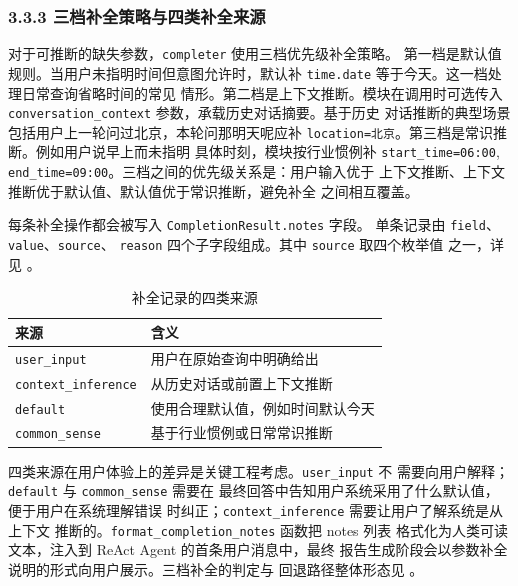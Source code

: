 \subsubsection*{3.3.3 \quad 三档补全策略与四类补全来源}

对于可推断的缺失参数，\texttt{completer} 使用三档优先级补全策略。
第一档是默认值规则。当用户未指明时间但意图允许时，默认补
\texttt{time.\bk{}date} 等于今天。这一档处理日常查询省略时间的常见
情形。第二档是上下文推断。模块在调用时可选传入
\texttt{conversation\_\bk{}context} 参数，承载历史对话摘要。基于历史
对话推断的典型场景包括用户上一轮问过北京，本轮问那明天呢应补
\texttt{location=\bk{}北京}。第三档是常识推断。例如用户说早上而未指明
具体时刻，模块按行业惯例补 \texttt{start\_\bk{}time=\bk{}06:00}, 
\texttt{end\_\bk{}time=\bk{}09:00}。三档之间的优先级关系是：用户输入优于
上下文推断、上下文推断优于默认值、默认值优于常识推断，避免补全
之间相互覆盖。

每条补全操作都会被写入 \texttt{CompletionResult.\bk{}notes} 字段。
单条记录由 \texttt{field}、\texttt{value}、\texttt{source}、
\texttt{reason} 四个子字段组成。其中 \texttt{source} 取四个枚举值
之一，详见 。

\begin{table}[!ht]
    \centering
    \caption{补全记录的四类来源}
    \label{tab:completion-sources}
    \song\fontsize{9pt}{12pt}\selectfont
    \renewcommand{\arraystretch}{0.95}
    \begin{tabular}{ll}
        \toprule
        来源 & 含义 \\
        \midrule
        \texttt{user\_\bk{}input} & 用户在原始查询中明确给出 \\
        \texttt{context\_\bk{}inference} & 从历史对话或前置上下文推断 \\
        \texttt{default} & 使用合理默认值，例如时间默认今天 \\
        \texttt{common\_\bk{}sense} & 基于行业惯例或日常常识推断 \\
        \bottomrule
    \end{tabular}
\end{table}

四类来源在用户体验上的差异是关键工程考虑。\texttt{user\_\bk{}input} 不
需要向用户解释；\texttt{default} 与 \texttt{common\_\bk{}sense} 需要在
最终回答中告知用户系统采用了什么默认值，便于用户在系统理解错误
时纠正；\texttt{context\_\bk{}inference} 需要让用户了解系统是从上下文
推断的。\texttt{format\_\bk{}completion\_\bk{}notes} 函数把 notes 列表
格式化为人类可读文本，注入到 ReAct Agent 的首条用户消息中，最终
报告生成阶段会以参数补全说明的形式向用户展示。三档补全的判定与
回退路径整体形态见 。

